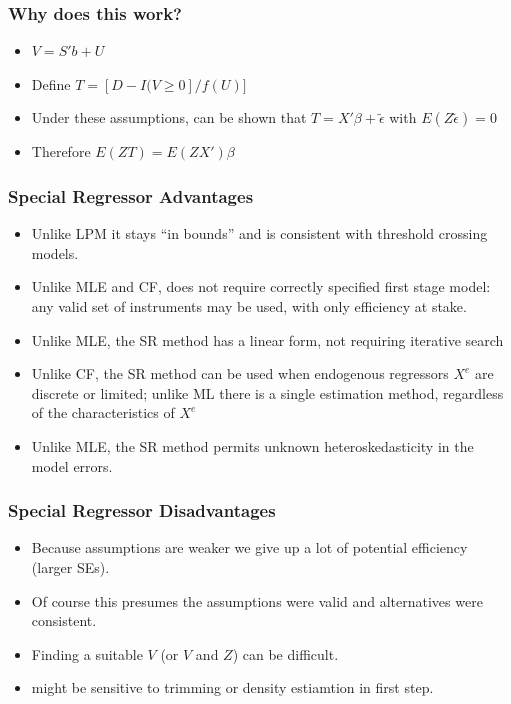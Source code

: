 \documentclass[11pt,dvipsnames,table,aspectratio=169]{beamer}
\begin{document}
\begin{frame}
       \frametitle{Why does this work?}
       \begin{itemize}
       \item $V = S'b + U$ 
       \item Define $T = [ D - I(V \ge 0 ]/f(U) ] $
       \item Under these assumptions, can be shown that $T = X'\beta + \tilde \epsilon $ with $E(Z \tilde \epsilon) = 0$
       \item Therefore $E(ZT) = E(ZX')\beta$ 
       \end{itemize}
\end{frame}

\begin{frame}
\frametitle{Special Regressor Advantages}
\begin{itemize}\setlength{\itemsep}{1em}
\item Unlike LPM it stays ``in bounds'' and is consistent with threshold crossing models.
\item Unlike MLE and CF, does not require correctly specified first stage model: any valid set of instruments may be used, with only efficiency at stake.
\item Unlike MLE, the SR method has a linear form, not requiring iterative search
\item Unlike CF, the SR method can be used when endogenous regressors $X^e$ are discrete or limited; unlike ML there is a single estimation method, regardless of the characteristics of $X^e$
\item Unlike MLE, the SR method permits unknown heteroskedasticity in the model errors.
\end{itemize}
\end{frame}

\begin{frame}
\frametitle{Special Regressor Disadvantages}
\begin{itemize}\setlength{\itemsep}{1em}
\item Because assumptions are weaker we give up a lot of potential efficiency (larger SEs).
\item Of course this presumes the assumptions were valid and alternatives were consistent.
\item Finding a suitable $V$ (or $V$ and $Z$) can be difficult.
\item might be sensitive to trimming or density estiamtion in first step. 
\end{itemize}
\end{frame}
\end{document}
